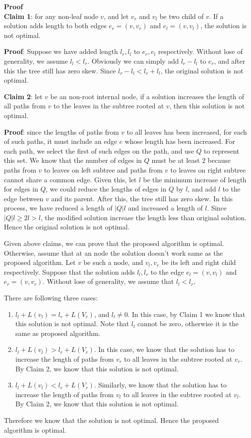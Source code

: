 \documentclass{article}
\newcommand{\Proof}{\vspace{0.3cm} \noindent\textbf{Proof} \\}
\begin{document}
\Proof
\textbf{Claim 1}: for any non-leaf node $v$, and let $v_r$ and $v_l$ be two child of $v$. If a
solution adds
length to both edges $e_r = (v, v_r)$ and $e_l = (v, v_l)$, the solution is not optimal.

\textbf{Proof}: Suppose we have added length $l_r, l_l$ to $e_r, e_l$ respectively. Without lose of
generality, we assume $l_l < l_r$. Obviously we can simply add $l_r - l_l$ to $e_r$, and after this
the tree still has zero skew. Since $l_r - l_l < l_r + l_l$, the original solution is not optimal.

\textbf{Claim 2}: let $v$ be an non-root internal node, if a solution increases the length of all paths from
$v$ to the leaves in the subtree rooted at $v$, then this solution is not optimal.

\textbf{Proof}: since the lengths of paths from $v$ to all leaves has been increased, for each
of such paths, it must include an edge $e$ whose length has been increased. For each path, we select
the first of such edges on the path, and use $Q$ to represent this set. We know that the number of edges
in $Q$ must be at least $2$ because paths from $v$ to leaves on left subtree and paths from $v$ 
to leaves on right subtree cannot share a common edge. Given this, let $l$ be the minimum increase
of length for edges in $Q$, we could reduce the  lengths of edges in $Q$ by $l$, and add $l$ to the
edge between $v$ and its parent. After this, the tree still has zero skew. In this process, we have
reduced a length of $|Q|l$ and increased a length of $l$. Since $|Q|l \geq 2l > l$, the modified solution increase
the length less than original solution. Hence the original solution is not optimal.

Given above claims, we can prove that the proposed algorithm is optimal. Otherwise, assume that
at an node the solution doesn't work same as the proposed algorithm. Let $v$ be such a node, and
$v_l, v_r$ be its left and right child respectively. Suppose that the solution adds $l_l, l_r$ to 
the edge $e_l = (v, v_l)$ and $e_r = (v, v_r)$. Without lose of generality, we assume that $l_l <
l_r$. 

There are following three cases:
\begin{enumerate}
  \item $l_l  + L(v_l) = l_r + L(V_r)$, and $l_l \neq 0$. In this case, by Claim 1 we know that this
    solution is not optimal. Note that $l_l$ cannot be zero, otherwise it is the same as proposed
    algorithm.

  \item $l_l  + L(v_l) > l_r + L(V_r)$. In this case, we know that the solution has to increase the
    length of paths from $v_r$ to all leaves in the subtree rooted at $v_r$. By Claim 2, we know
    that this solution is not optimal.

  \item $l_l  + L(v_l) < l_r + L(V_r)$. Similarly, we know that the solution has to increase the
    length of paths from $v_l$ to all leaves in the subtree rooted at $v_l$. By Claim 2, we know
    that this solution is not optimal.
\end{enumerate}
Therefore we know that the solution is not optimal. Hence the proposed algorithm is optimal.
\end{document}
